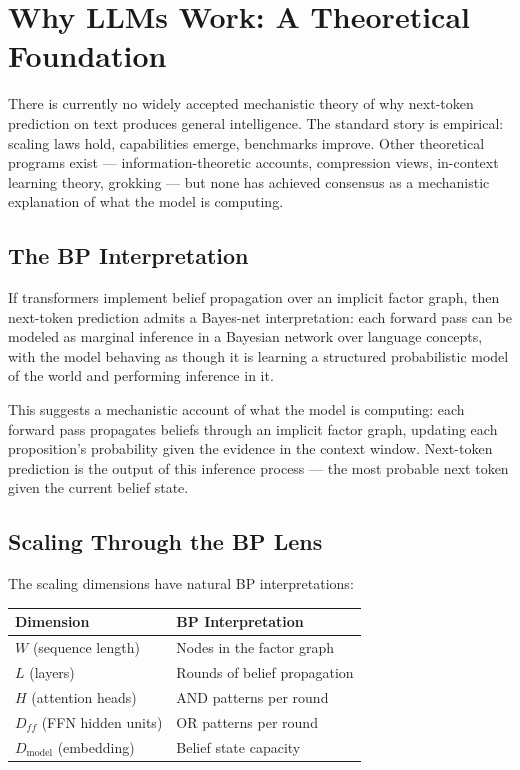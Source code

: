\section{Why LLMs Work: A Theoretical Foundation}
\label{sec:why-llms-work}

There is currently no widely accepted mechanistic theory of why next-token
prediction on text produces general intelligence. The standard story is
empirical: scaling laws hold, capabilities emerge, benchmarks improve.
Other theoretical programs exist --- information-theoretic accounts,
compression views, in-context learning theory, grokking --- but none has
achieved consensus as a mechanistic explanation of what the model is
computing.

\subsection*{The BP Interpretation}

If transformers implement belief propagation over an implicit factor graph,
then next-token prediction admits a Bayes-net interpretation: each forward
pass can be modeled as marginal inference in a Bayesian network over
language concepts, with the model behaving as though it is learning a
structured probabilistic model of the world and performing inference in it.

This suggests a mechanistic account of what the model is computing: each
forward pass propagates beliefs through an implicit factor graph, updating
each proposition's probability given the evidence in the context window.
Next-token prediction is the output of this inference process --- the most
probable next token given the current belief state.

\subsection*{Scaling Through the BP Lens}

The scaling dimensions have natural BP interpretations:

\begin{center}
\begin{tabular}{ll}
\toprule
Dimension & BP Interpretation \\
\midrule
$W$ (sequence length) & Nodes in the factor graph \\
$L$ (layers) & Rounds of belief propagation \\
$H$ (attention heads) & AND patterns per round \\
$D_{ff}$ (FFN hidden units) & OR patterns per round \\
$D_{\mathrm{model}}$ (embedding) & Belief state capacity \\
\bottomrule
\end{tabular}
\end{center}

